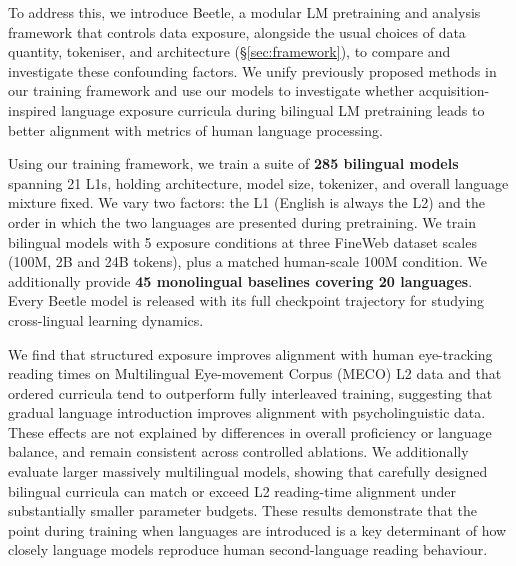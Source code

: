 \documentclass[11pt]{article}
\newcommand{\beetle}{Beetle} %
\begin{document}
To address this, we introduce \beetle{}, a modular LM pretraining and analysis framework that controls data exposure, alongside the usual choices of data quantity, tokeniser, and architecture (\S\ref{sec:framework}), to compare and investigate these confounding factors. We unify previously proposed methods in our training framework %
and use our models to investigate whether acquisition-inspired language exposure curricula during bilingual LM pretraining leads to better alignment with metrics of human language processing. %

Using our training framework, we train a suite of \textbf{285 bilingual models} spanning 21 L1s, holding  architecture, model size, tokenizer, and overall language mixture fixed. We vary two factors: the L1 (English is always the L2) and the order in which the two  languages are presented during pretraining. We train bilingual models with 5  exposure conditions at three FineWeb dataset scales (100M, 2B and 24B tokens), plus a matched human-scale 100M condition.  We additionally provide \textbf{45 monolingual baselines covering 20 languages}. Every \beetle{} model is released with its full checkpoint trajectory for studying cross-lingual learning dynamics.






We find that structured exposure improves alignment with human eye-tracking reading times on Multilingual Eye-movement Corpus (MECO) L2 data \citep{kuperman2023text,kuperman2025new} and that ordered curricula tend to outperform fully interleaved training, suggesting that gradual language introduction improves alignment with psycholinguistic data. These effects are not explained by differences in overall proficiency or language balance, and remain consistent across controlled ablations. We additionally evaluate larger massively multilingual models, showing that carefully designed bilingual curricula can match or exceed L2 reading-time alignment under substantially smaller parameter budgets.  These results demonstrate that the point during training when languages are introduced is a key determinant of how closely language models reproduce human second-language reading behaviour. 
\end{document}
